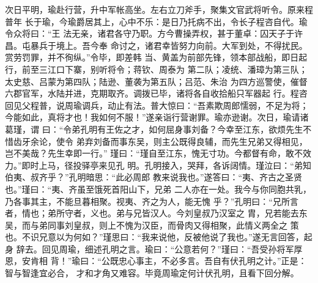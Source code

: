 次日平明，瑜赴行营，升中军帐高坐。左右立刀斧手，聚集文官武将听令。原来程普年
长于瑜，今瑜爵居其上，心中不乐：是日乃托病不出，令长子程咨自代。瑜令众将曰：“王
法无亲，诸君各守乃职。方今曹操弄权，甚于董卓：囚天子于许昌。屯暴兵于境上。吾今奉
命讨之，诸君幸皆努力向前。大军到处，不得扰民。赏劳罚罪，并不徇纵。”令毕，即差韩
当、黄盖为前部先锋，领本部战船，即日起行，前至三江口下寨，别听将令；蒋钦、周泰为
第二队；凌统、潘璋为第三队；太史慈、吕蒙为第四队；陆逊、董袭为第五队；吕范、朱治
为四方巡警使，催督六郡官军，水陆并进，克期取齐。调拨已毕，诸将各自收拾船只军器起
行。程咨回见父程普，说周瑜调兵，动止有法。普大惊曰：“吾素欺周郎懦弱，不足为将；
今能如此，真将才也！我如何不服！”遂亲诣行营谢罪。瑜亦逊谢。次日，瑜请诸葛瑾，谓
曰：“令弟孔明有王佐之才，如何屈身事刘备？今幸至江东，欲烦先生不惜齿牙余论，使令
弟弃刘备而事东吴，则主公既得良辅，而先生兄弟又得相见，岂不美哉？先生幸即一行。”
瑾曰：“瑾自至江东，愧无寸功。今都督有命，敢不效力。”即时上马，径投驿亭来见孔
明。孔明接入，哭拜，各诉阔情。瑾泣曰：“弟知伯夷、叔齐乎？”孔明暗思：“此必周郎
教来说我也。”遂答曰：“夷、齐古之圣贤也。”瑾曰：“夷、齐虽至饿死首阳山下，兄弟
二人亦在一处。我今与你同胞共乳，乃各事其主，不能旦暮相聚。视夷、齐之为人，能无愧
乎？”孔明曰：“兄所言者，情也；弟所守者，义也。弟与兄皆汉人。今刘皇叔乃汉室之
胄，兄若能去东吴，而与弟同事刘皇叔，则上不愧为汉臣，而骨肉又得相聚，此情义两全之
策也。不识兄意以为何如？”瑾思曰：“我来说他，反被他说了我也。”遂无言回答，起身
辞去。回见周瑜，细述孔明之言。瑜曰：“公意若何？”瑾曰：“吾受孙将军厚恩，安肯相
背！”瑜曰：“公既忠心事主，不必多言。吾自有伏孔明之计。”正是：智与智逢宜必合，
才和才角又难容。毕竟周瑜定何计伏孔明，且看下回分解。